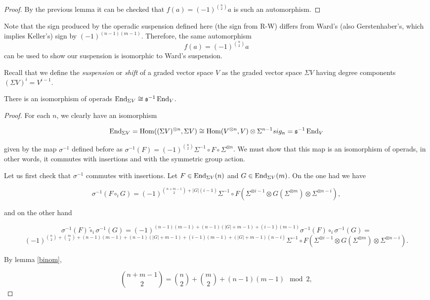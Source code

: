 \documentclass[twoside]{article}
\begin{document}
\begin{appendices}
\begin{proof}
By the previous lemma it can be checked that $f(a)=(-1)^{\binom{n}{2}}a$ is such an automorphism.
\end{proof}

Note that the sign produced by the operadic suspension defined here (the sign from R-W) differs from Ward's (also Gerstenhaber's, which implies Keller's) sign by $(-1)^{(n-1)(m-1)}$. Therefore, the same automorphism 
$$f(a)=(-1)^{\binom{n}{2}}a$$
 can be used to show our suspension is isomorphic to Ward's suspension. 

Recall that we define the \emph{suspension} or \emph{shift} of a graded vector space $V$ as the graded vector space $\Sigma V$ having degree components $(\Sigma V)^i=V^{i-1}$.

\begin{theorem}
There is an isomorphism of operads $\operatorname{End}_{\Sigma V}\cong \mathfrak{s}^{-1}\operatorname{End}_V$.
\end{theorem}
\begin{proof}
For each $n$, we clearly have an isomorphism 

$$\operatorname{End}_{\Sigma V}=\operatorname{Hom}((\Sigma V)^{\otimes n},\Sigma V)\cong\operatorname{Hom}(V^{\otimes n},V)\otimes \Sigma^{n-1}sig_n= \mathfrak{s}^{-1}\operatorname{End}_V$$

given by the map $\sigma^{-1}$ defined before as $\sigma^{-1}(F)=(-1)^{\binom{n}{2}}\Sigma^{-1}\circ F\circ\Sigma^{\otimes n}$. We must show that this map is an isomorphism of operads, in other words, it commutes with insertions and with the symmetric group action.

Let us first check that $\sigma^{-1}$ commutes with insertions. Let $F\in \operatorname{End}_{\Sigma V}(n)$ and $G\in \operatorname{End}_{\Sigma V}(m)$. On the one had we have 

$$\sigma^{-1}(F\circ_i G)=(-1)^{\binom{n+m-1}{2}+|G|(i-1)}\Sigma^{-1}\circ F(\Sigma^{\otimes i-1}\otimes G(\Sigma^{\otimes m})\otimes\Sigma^{\otimes n-i}),$$

and on the other hand

$$\sigma^{-1}(F)\tilde{\circ}_i\sigma^{-1}(G)=(-1)^{(n-1)(m-1)+(n-1)(|G|+m-1)+(i-1)(m-1)}\sigma^{-1}(F)\circ_i\sigma^{-1}(G)=$$
$$(-1)^{\binom{n}{2}+\binom{m}{2}+(n-1)(m-1)+(n-1)(|G|+m-1)+(i-1)(m-1)+(|G|+m-1)(n-i)}\Sigma^{-1}\circ F(\Sigma^{\otimes i-1}\otimes G(\Sigma^{\otimes m})\otimes\Sigma^{\otimes n-i}).$$

By lemma \ref{binom}, 

$$\binom{n+m-1}{2}=\binom{n}{2}+\binom{m}{2}+(n-1)(m-1)\mod 2,$$


\end{proof}
\end{appendices}
\end{document}
